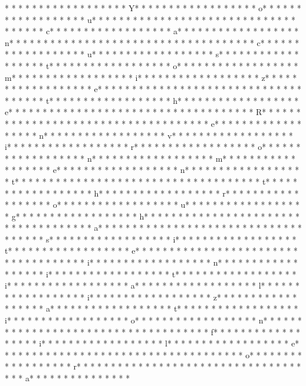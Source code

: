 * * *  * * *  * * *  *  * * *  *  * * *  * Y* * *  * * *  * * *  *  * * *  *  * * *  * o* * *  * * *  * * *  *  * * *  *  * * *  * u* * *  * * *  * * *  *  * * *  *  * * *  *  * * *  * * *  * * *  *  * * *  *  * * *  * c* * *  * * *  * * *  *  * * *  *  * * *  * a* * *  * * *  * * *  *  * * *  *  * * *  * n* * *  * * *  * * *  *  * * *  *  * * *  *  * * *  * * *  * * *  *  * * *  *  * * *  * c* * *  * * *  * * *  *  * * *  *  * * *  * u* * *  * * *  * * *  *  * * *  *  * * *  * s* * *  * * *  * * *  *  * * *  *  * * *  * t* * *  * * *  * * *  *  * * *  *  * * *  * o* * *  * * *  * * *  *  * * *  *  * * *  * m* * *  * * *  * * *  *  * * *  *  * * *  * i* * *  * * *  * * *  *  * * *  *  * * *  * z* * *  * * *  * * *  *  * * *  *  * * *  * e* * *  * * *  * * *  *  * * *  *  * * *  *  * * *  * * *  * * *  *  * * *  *  * * *  * t* * *  * * *  * * *  *  * * *  *  * * *  * h* * *  * * *  * * *  *  * * *  *  * * *  * e* * *  * * *  * * *  *  * * *  *  * * *  *  * * *  * * *  * * *  *  * * *  *  * * *  * R* * *  * * *  * * *  *  * * *  *  * * *  *  * * *  * * *  * * *  *  * * *  *  * * *  * e* * *  * * *  * * *  *  * * *  *  * * *  * n* * *  * * *  * * *  *  * * *  *  * * *  * v* * *  * * *  * * *  *  * * *  *  * * *  * i* * *  * * *  * * *  *  * * *  *  * * *  * r* * *  * * *  * * *  *  * * *  *  * * *  * o* * *  * * *  * * *  *  * * *  *  * * *  * n* * *  * * *  * * *  *  * * *  *  * * *  * m* * *  * * *  * * *  *  * * *  *  * * *  * e* * *  * * *  * * *  *  * * *  *  * * *  * n* * *  * * *  * * *  *  * * *  *  * * *  * t* * *  * * *  * * *  *  * * *  *  * * *  *  * * *  * * *  * * *  *  * * *  *  * * *  * t* * *  * * *  * * *  *  * * *  *  * * *  * h* * *  * * *  * * *  *  * * *  *  * * *  * r* * *  * * *  * * *  *  * * *  *  * * *  * o* * *  * * *  * * *  *  * * *  *  * * *  * u* * *  * * *  * * *  *  * * *  *  * * *  * g* * *  * * *  * * *  *  * * *  *  * * *  * h* * *  * * *  * * *  *  * * *  *  * * *  *  * * *  * * *  * * *  *  * * *  *  * * *  * a* * *  * * *  * * *  *  * * *  *  * * *  *  * * *  * * *  * * *  *  * * *  *  * * *  * s* * *  * * *  * * *  *  * * *  *  * * *  * i* * *  * * *  * * *  *  * * *  *  * * *  * t* * *  * * *  * * *  *  * * *  *  * * *  * e* * *  * * *  * * *  *  * * *  *  * * *  *  * * *  * * *  * * *  *  * * *  *  * * *  * i* * *  * * *  * * *  *  * * *  *  * * *  * n* * *  * * *  * * *  *  * * *  *  * * *  * i* * *  * * *  * * *  *  * * *  *  * * *  * t* * *  * * *  * * *  *  * * *  *  * * *  * i* * *  * * *  * * *  *  * * *  *  * * *  * a* * *  * * *  * * *  *  * * *  *  * * *  * l* * *  * * *  * * *  *  * * *  *  * * *  * i* * *  * * *  * * *  *  * * *  *  * * *  * z* * *  * * *  * * *  *  * * *  *  * * *  * a* * *  * * *  * * *  *  * * *  *  * * *  * t* * *  * * *  * * *  *  * * *  *  * * *  * i* * *  * * *  * * *  *  * * *  *  * * *  * o* * *  * * *  * * *  *  * * *  *  * * *  * n* * *  * * *  * * *  *  * * *  *  * * *  *  * * *  * * *  * * *  *  * * *  *  * * *  * f* * *  * * *  * * *  *  * * *  *  * * *  * i* * *  * * *  * * *  *  * * *  *  * * *  * l* * *  * * *  * * *  *  * * *  *  * * *  * e* * *  * * *  * * *  *  * * *  *  * * *  *  * * *  * * *  * * *  *  * * *  *  * * *  * o* * *  * * *  * * *  *  * * *  *  * * *  * r* * *  * * *  * * *  *  * * *  *  * * *  *  * * *  * * *  * * *  *  * * *  *  * * *  * a* * *  * * *  * * *  *  * * *  *  * 